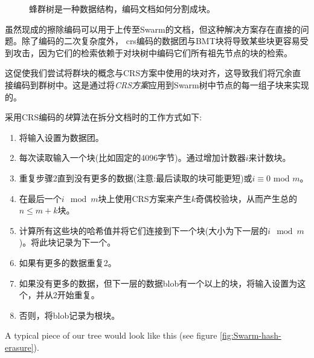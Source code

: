 \begin{figure}[htbp]
   \centering
   
   \caption[群集哈希分裂\statusgreen]{蜂群树是一种数据结构，编码文档如何分割成块。}
   \label{fig:Swarm-hash-split}
\end{figure}

虽然现成的擦除编码可以用于上传至Swarm的文档，但这种解决方案存在直接的问题。除了编码的二次复杂度外， crs编码的数据团与BMT块将导致某些块更容易受到攻击，因为它们的检索依赖于对块树中编码它们所有祖先节点的块的检索。

这促使我们尝试将群块的概念与CRS方案中使用的块对齐，这导致我们将冗余直接编码到群树中。这是通过将\emph{CRS方案}应用到Swarm树中节点的每一组子块来实现的。

采用CRS编码的\emph{块}算法在拆分文档时的工作方式如下:

\begin{enumerate}
\item 将输入设置为数据团。
\item 每次读取输入一个块(比如固定的4096字节)。通过增加计数器$i$来计数块。 
\item 重复步骤2直到没有更多的数据(注意:最后读取的块可能更短)或$i \equiv 0$ mod $m$。
\item 在最后一个$i \mod m$块上使用CRS方案来产生$k$奇偶校验块，从而产生总的$n \leq m+k$块。
\item 计算所有这些块的哈希值并将它们连接到下一个块(大小为下一层的$i\mod m$)。将此块记录为下一个。
\item 如果有更多的数据重复2。 
\item 如果没有更多的数据，但下一层的数据blob有一个以上的块，将输入设置为这个，并从2开始重复。
\item 否则，将blob记录为根块。
\end{enumerate}


A typical piece of our tree would look like this (see figure \ref{fig:Swarm-hash-erasure}).


